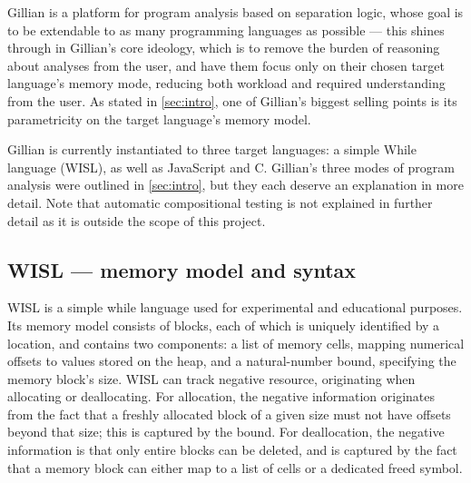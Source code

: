 
Gillian is a platform for program analysis based on separation logic, whose
goal is to be extendable to as many programming languages as possible --- this
shines through in Gillian's core ideology, which is to remove the burden of
reasoning about analyses from the user, and have them focus only on their
chosen target language's memory mode, reducing both workload and required
understanding from the user. As stated in \autoref{sec:intro}, one of
Gillian's biggest selling points is its parametricity on the target language's
memory model.

Gillian is currently instantiated to three target languages: a simple While
language (WISL), as well as JavaScript and C. Gillian's three modes of program
analysis were outlined in \autoref{sec:intro}, but they each deserve an
explanation in more detail. Note that automatic compositional testing is not
explained in further detail as it is outside the scope of this project.

\subsection{WISL --- memory model and syntax}
WISL is a simple while language used for experimental and educational purposes. Its memory model consists of blocks, each of which is uniquely identified by a location, and contains two components: a list of memory cells, mapping numerical offsets to values stored on the heap, and a natural-number bound, specifying the memory block's size.  WISL can track negative resource, originating when allocating or deallocating. For allocation, the negative information originates from the fact that a freshly allocated block of a given size must not have offsets beyond that size; this is captured by the bound. For deallocation, the negative information is that only entire blocks can be deleted, and is captured by the fact that a memory block can either map to a list of cells or a dedicated freed symbol.

